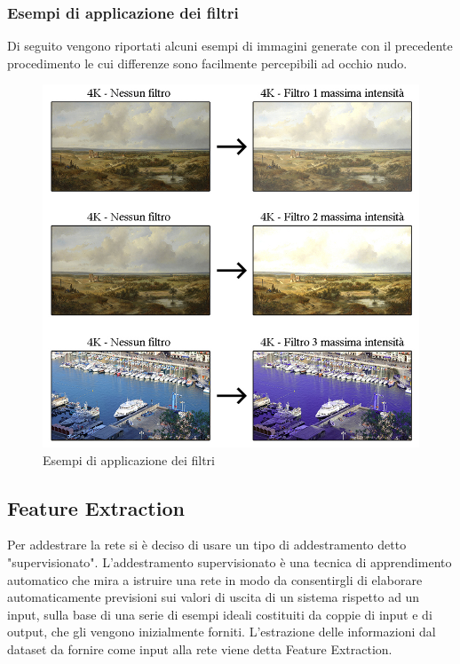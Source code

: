 \documentclass[a4paper,11pt]{article}
\begin{document}
    \subsubsection{Esempi di applicazione dei filtri}
    Di seguito vengono riportati alcuni esempi di immagini generate con il precedente procedimento le cui differenze sono facilmente percepibili ad occhio nudo.
    \begin{figure}[h]
        \centering
        \includegraphics[scale=0.45]{filtri}
        \caption{Esempi di applicazione dei filtri}
    \end{figure}


    \newpage
    
    \subsection{Feature Extraction}
    Per addestrare la rete si è deciso di usare un tipo di addestramento detto "supervisionato". 
    L'addestramento supervisionato è una tecnica di apprendimento automatico che mira a istruire una rete in modo da consentirgli di elaborare automaticamente previsioni sui valori di uscita di un sistema rispetto 
    ad un input, sulla base di una serie di esempi ideali costituiti da coppie di input e di output, che gli vengono inizialmente forniti. L'estrazione delle informazioni dal dataset da fornire come input alla rete viene detta Feature Extraction.
    
\end{document}
